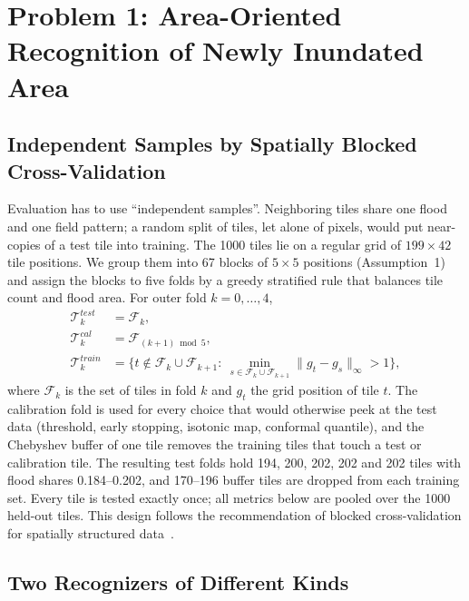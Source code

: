 \section[Problem 1]{Problem 1: Area-Oriented Recognition of Newly Inundated Area}
\label{sec:q1}

\subsection{Independent Samples by Spatially Blocked Cross-Validation}

Evaluation has to use ``independent samples''. Neighboring tiles share one flood and one field pattern; a random split of tiles, let alone of pixels, would put near-copies of a test tile into training. The 1000 tiles lie on a regular grid of $199\times42$ tile positions. We group them into 67 blocks of $5\times5$ positions (Assumption~1) and assign the blocks to five folds by a greedy stratified rule that balances tile count and flood area. For outer fold $k=0,\dots,4$,
\begin{equation}
\begin{split}
\mathcal T^{test}_k&=\mathcal F_k,\\
\mathcal T^{cal}_k&=\mathcal F_{(k+1)\bmod 5},\\
\mathcal T^{train}_k&=\Big\{t\notin\mathcal F_k\cup\mathcal F_{k+1}:\ \min_{s\in\mathcal F_k\cup\mathcal F_{k+1}}\lVert g_t-g_s\rVert_\infty>1\Big\},
\end{split}
\label{eq:folds}
\end{equation}
where $\mathcal F_k$ is the set of tiles in fold $k$ and $g_t$ the grid position of tile $t$. The calibration fold is used for every choice that would otherwise peek at the test data (threshold, early stopping, isotonic map, conformal quantile), and the Chebyshev buffer of one tile removes the training tiles that touch a test or calibration tile. The resulting test folds hold 194, 200, 202, 202 and 202 tiles with flood shares 0.184--0.202, and 170--196 buffer tiles are dropped from each training set. Every tile is tested exactly once; all metrics below are pooled over the 1000 held-out tiles. This design follows the recommendation of blocked cross-validation for spatially structured data~\cite{roberts2017crossvalidation}.

\subsection{Two Recognizers of Different Kinds}

